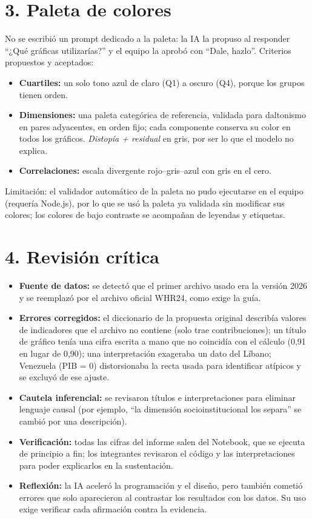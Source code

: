 \documentclass[10pt,a4paper]{article}
\begin{document}
\section*{3. Paleta de colores}
No se escribió un prompt dedicado a la paleta: la IA la propuso al responder ``¿Qué gráficas utilizarías?'' y el
equipo la aprobó con ``Dale, hazlo''. Criterios propuestos y aceptados:
\begin{itemize}
\item \textbf{Cuartiles:} un solo tono azul de claro (Q1) a oscuro (Q4), porque los grupos tienen orden.
\item \textbf{Dimensiones:} una paleta categórica de referencia, validada para daltonismo en pares adyacentes, en orden fijo; cada componente conserva su color en todos los gráficos. \textit{Distopía + residual} en gris, por ser lo que el modelo no explica.
\item \textbf{Correlaciones:} escala divergente rojo--gris--azul con gris en el cero.
\end{itemize}
Limitación: el validador automático de la paleta no pudo ejecutarse en el equipo (requería Node.js), por lo que
se usó la paleta ya validada sin modificar sus colores; los colores de bajo contraste se acompañan de leyendas y etiquetas.

\section*{4. Revisión crítica}
\begin{itemize}
\item \textbf{Fuente de datos:} se detectó que el primer archivo usado era la versión 2026 y se reemplazó por el
  archivo oficial WHR24, como exige la guía.
\item \textbf{Errores corregidos:} el diccionario de la propuesta original describía valores de indicadores que el
  archivo no contiene (solo trae contribuciones); un título de gráfico tenía una cifra escrita a mano que no coincidía con el
  cálculo (0,91 en lugar de 0,90); una interpretación exageraba un dato del Líbano; Venezuela (PIB = 0) distorsionaba la
  recta usada para identificar atípicos y se excluyó de ese ajuste.
\item \textbf{Cautela inferencial:} se revisaron títulos e interpretaciones para eliminar lenguaje causal
  (por ejemplo, ``la dimensión socioinstitucional los separa'' se cambió por una descripción).
\item \textbf{Verificación:} todas las cifras del informe salen del Notebook, que se ejecuta de principio a fin;
  los integrantes revisaron el código y las interpretaciones para poder explicarlos en la sustentación.
\item \textbf{Reflexión:} la IA aceleró la programación y el diseño, pero también cometió errores que solo
  aparecieron al contrastar los resultados con los datos. Su uso exige verificar cada afirmación contra la evidencia.
\end{itemize}
\end{document}
